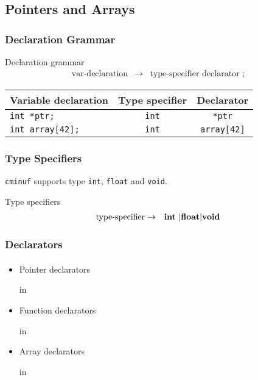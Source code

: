 \documentclass{beamer}
\begin{document}
\subsection{Pointers and Arrays}

\begin{frame}
    \frametitle{Declaration Grammar}
    \begin{block}{Declaration grammar}
        $$
            \begin{aligned}
                \text{var-declaration} & \rightarrow & \text{type-specifier declarator ;}
            \end{aligned}
        $$
    \end{block}

    \begin{example}
        \begin{center}
            \begin{tabular}{l |c | c }
                Variable declaration       & Type specifier        & Declarator \\
                \hline \hline
                \lstinline{int *ptr;}       & \lstinline{int} & \lstinline{*ptr}                   \\
                \lstinline{int array[42];}     & \lstinline{int} & \lstinline{array[42]}
            \end{tabular}
        \end{center}
    \end{example}
\end{frame}

\begin{frame}
    \frametitle{Type Specifiers}
    \lstinline{cminuf} supports type \lstinline{int}, \lstinline{float} and \lstinline{void}.
    \begin{block}{Type specifiers}
        $$
            \begin{aligned}
                \text{type-specifier} & \rightarrow & \text{\textbf{int} \textbar
                    \textbf{float}\textbar\textbf{void}}
            \end{aligned}
        $$
    \end{block}

\end{frame}

\begin{frame}
    \frametitle{Declarators}
    \framesubtitle{}
    \begin{itemize}
        \item Pointer declarators

               in 
        \item Function declarators

               in 

        \item Array declarators

               in 
    \end{itemize}

\end{frame}
\end{document}
